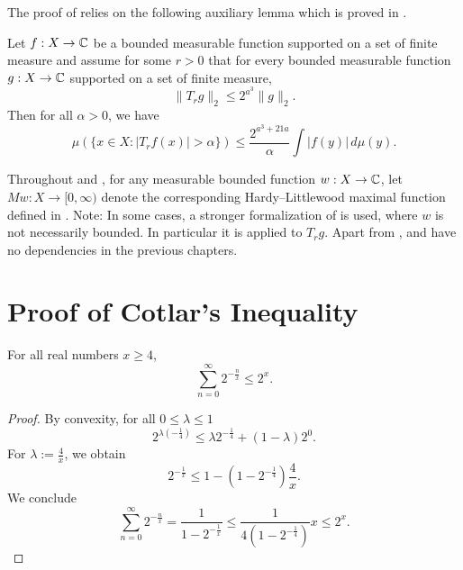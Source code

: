 The proof of  relies on the following auxiliary lemma which is proved in .
\begin{lemma}
    \label{calderon-zygmund-weak-1-1}
    \leanok
    Let $f:X\to\mathbb{C}$ be a bounded measurable function supported on a set of finite measure and assume for some $r>0$ that for every bounded measurable function $g:X\to\mathbb{C}$ supported on a set of finite measure,
    \begin{equation}
        \label{eq-strong-2-2-assumption}
        \|T_rg\|_{2}\le 2^{a^3} \|g\|_2.
    \end{equation}
    Then for all $\alpha>0$, we have
    \begin{equation}
        \label{eq-weak-1-1}
        \mu\left(\{x\in X: |T_r f(x)|>\alpha\}\right)\le \frac{2^{a^3 + 21a}}{\alpha} \int |f(y)|\, d\mu(y).
    \end{equation}
\end{lemma}
Throughout  and , for any measurable bounded function $w: X \to \mathbb{C}$, let $Mw: X \to [0, \infty)$ denote the corresponding Hardy--Littlewood maximal function defined in .
Note: In some cases, a stronger formalization of  is used, where $w$ is not necessarily bounded. In particular it is applied to $T_rg$.
Apart from ,  and  have no dependencies in the previous chapters.



\section{Proof of Cotlar's Inequality}
\label{subsec-cotlar}

\begin{lemma}
    \label{geometric-series-estimate}
    \leanok
    For all real numbers $x\ge 4$,
    \begin{equation*}
        \sum_{n=0}^\infty 2^{-\frac{n}{x}} \le 2^x.
    \end{equation*}
\end{lemma}
\begin{proof}
    \leanok
    By convexity, for all $0\le\lambda\le1$
    \begin{equation*}
        2^{\lambda(-\frac{1}{4})} \le \lambda 2^{-\frac{1}{4}} + (1-\lambda)2^0.
    \end{equation*}
    For $\lambda:=\frac{4}{x}$, we obtain
    \begin{equation*}
        2^{-\frac 1 x} \le 1 - (1-2^{-\frac 1 4}) \frac{4}{x}.
    \end{equation*}
    We conclude
    \begin{equation*}
        \sum_{n=0}^\infty 2^{-\frac{n}{x}} = \frac{1}{1-2^{-\frac 1 x}} \le \frac{1}{4(1-2^{-\frac 1 4})} x \le 2^x.
    \end{equation*}
\end{proof}

